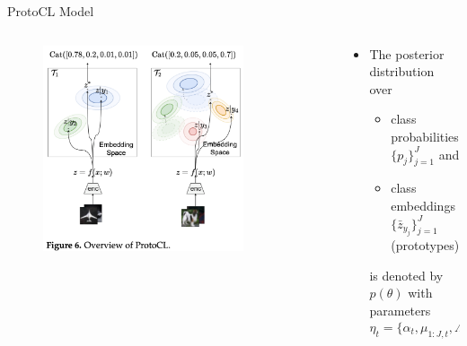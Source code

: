 \documentclass[12pt,aspectratio=169, handout]{beamer}
\let\olditem\item
\renewcommand\item{\olditem\justifying}
\begin{document}
\begin{frame}{ProtoCL Model}
\begin{columns}
    \begin{column}{0.4\textwidth}
        \begin{figure}
		\centering
		\includegraphics[width=0.8\textwidth]{"images/Fig6_full.png"}
	\end{figure}
    \end{column} 
    \begin{column}{0.6\textwidth}
        \begin{itemize}[<+->]
            \item The posterior distribution over 
            \begin{itemize}
                \item class probabilities $\{p_j\}_{j=1}^J$ and 
                \item class embeddings $\{\bar{z}_{y_j}\}_{j=1}^J$ (prototypes)
            \end{itemize} \pause is denoted by $p(\theta)$ with parameters $$\eta_t = \{\alpha_t, \mu_{1:J, t}, \Lambda_{1:J, t}^{-1}\}$$
            
        \end{itemize}
    \end{column}
\end{columns}
\end{frame}
\end{document}
